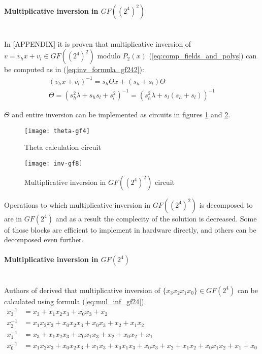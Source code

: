 \paragraph{Multiplicative inversion in $GF((2^4)^2)$}\mbox{}\\
In \cite{vlsi}[APPENDIX] it is proven that multiplicative inversion of $v = v_hx + v_l \in GF((2^4)^2)$ modulo $P_2(x)$ (\ref{eq:comp_fields_and_polys}) can be computed as in (\ref{eq:inv_formula_gf242}):
\begin{equation}
\begin{gathered}
\label{eq:inv_formula_gf242}
(v_hx + v_l)^{-1} = s_h \Theta x + (s_h + s_l) \Theta\\
\Theta = (s_h^2 \lambda + s_hs_l + s_l^2)^{-1} = (s_h^2 \lambda + s_l (s_h + s_l))^{-1}
\end{gathered}
\end{equation}

$\Theta$ and entire inversion can be implemented as circuits in figures \ref{fig:theta_impl} and \ref{fig:mul_inv_gf242}.

\begin{figure}
\label{fig:theta_impl}
\centering
\texttt{[image: theta-gf4]}
\caption{Theta calculation circuit}
\end{figure}

\begin{figure}
\label{fig:mul_inv_gf242}
\centering
\texttt{[image: inv-gf8]}
\caption{Multiplicative inversion in $GF((2^4)^2)$ circuit}
\end{figure}

Operations to which multiplicative inversion in $GF((2^4)^2)$ is decomposed to are in $GF(2^4)$ and as a result the complecity of the solution is decreased. Some of those blocks are efficient to implement in hardware directly, and others can be decomposed even further.

\paragraph{Multiplicative inversion in $GF(2^4)$}\mbox{}\\
Authors of \cite{vlsi} derived that multiplicative inversion of $\{x_3x_2x_1x_0\} \in GF(2^4)$ can be calculated using formula (\ref{eq:mul_inf_gf24}).
\begin{equation}
\label{eq:mul_inf_gf24}
\begin{aligned}
x_3^{-1} &= x_3 + x_1x_2x_3 + x_0x_3 + x_2\\
x_2^{-1} &= x_1x_2x_3 + x_0x_2x_3 + x_0x_3 + x_2 + x_1x_2\\
x_1^{-1} &= x_3 + x_1x_2x_3 + x_0x_1x_3 + x_2 + x_0x_2 + x_1\\
x_0^{-1} &= x_1x_2x_3 + x_0x_2x_3 + x_1x_3 + x_0x_1x_3 + x_0x_3 + x_2 + x_1x_2 + x_0x_1x_2 + x_1 + x_0
\end{aligned}
\end{equation}

